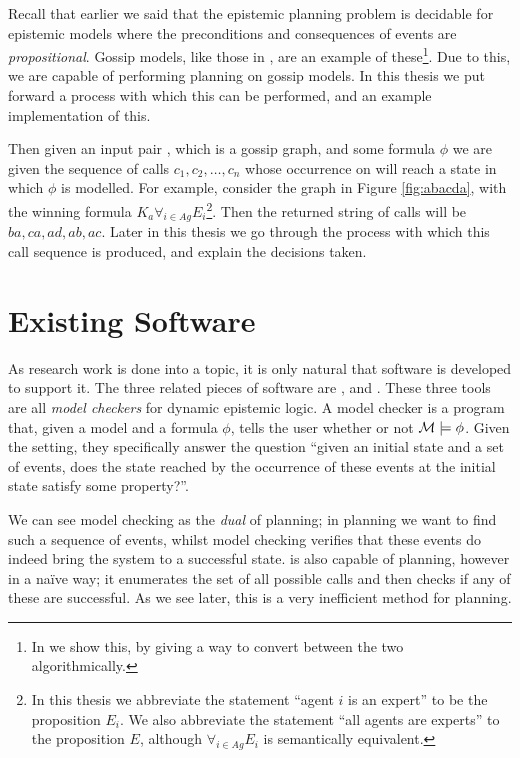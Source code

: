 \documentclass[ %
                    author={Leo Poulson},
                supervisor={Dr. Steven Ramsay},
                    degree={BSc},
                     title={Epistemic Planning for the Dynamic Gossip problem},
                  subtitle={},
                      year={2019} ]{dissertation}
\begin{document}
Recall that earlier we said that the epistemic planning problem is decidable for
epistemic models where the preconditions and consequences of events are
\emph{propositional}. Gossip models, like those in ,
are an example of these\footnote{In  we show this, by
giving a way to convert between the two algorithmically.}. Due to this, we are
capable of performing planning on gossip models. In this thesis we put forward a
process with which this can be performed, and an example implementation of this.

Then given an input pair , which is a gossip graph, and some formula
$\phi$ we are given the sequence of calls $c_1, c_2, \ldots, c_n$ whose
occurrence on  will reach a state in which $\phi$ is modelled. For
example, consider the graph in Figure \ref{fig:abacda}, with the winning formula
$K_a \forall_{i \in Ag} E_i$\footnote{In this thesis we abbreviate the statement
  ``agent $i$ is an expert'' to be the proposition $E_i$. We also abbreviate the
  statement ``all agents are experts'' to the proposition $E$, although
  $\forall_{i \in Ag}E_i$ is semantically equivalent.}. Then the returned string
of calls will be $ba, ca, ad, ab, ac$. Later in this thesis we go through the
process with which this call sequence is produced, and explain the decisions
taken.

\section{Existing Software}

As research work is done into a topic, it is only natural that software is
developed to support it. The three related pieces of software are
\cite{DEMO-S5}, \cite{SMCDEL} and \cite{GithubGossip}. These three tools are all
\emph{model checkers} for dynamic epistemic logic. A model checker is a
program that, given a model  and a formula $\phi$, tells the user whether
or not $\mathcal{M} \models \phi$. Given the setting, they specifically answer the
question ``given an initial state and a set of events, does the state reached by
the occurrence of these events at the initial state satisfy some property?''.

We can see model checking as the \emph{dual} of planning; in planning we want
to find such a sequence of events, whilst model checking verifies that these
events do indeed bring the system to a successful state. \cite{GithubGossip} is
also capable of planning, however in a na{\"i}ve way; it enumerates the set of
all possible calls and then checks if any of these are successful. As we see
later, this is a very inefficient method for planning.  
\end{document}
